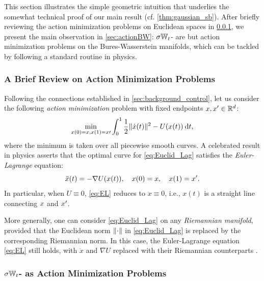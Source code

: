 This section illustrates the simple geometric intuition that underlies the somewhat technical proof of our main result (cf. \cref{thm:gaussian_sb}). After briefly reviewing the action minimization problems on Euclidean spaces in \cref{sec:actionRd}, we present the main observation in \cref{sec:actionBW}: $\sigma\mathbb{W}_{t}$- are but action minimization problems on the Bures-Wasserstein manifolds, which can be tackled by following a standard routine in physics. 

 
\subsubsection{A Brief Review on Action Minimization Problems}%
\label{sec:actionRd}

Following the connections established in \cref{sec:background_control}, let us consider the following \emph{action minimization} problem with fixed endpoints $x, x' \in \mathbb{R}^d$:
\begin{align}
\label{eq:Euclid_Lag}
\min_{x(0) = x, x(1) = x\prime} \int_0^1 {\frac{1}{2} \lVert\dot{x}(t)\rVert^2 - U(x(t)) } \:\mathrm{d} t,
\end{align}
where the minimum is taken over all piecewise smooth curves. 
A celebrated result in physics asserts that the optimal curve for \eqref{eq:Euclid_Lag} satisfies the \emph{Euler-Lagrange} equation:
\begin{equation}
\label{eq:EL}
\ddot{x}(t) = -\nabla U(x(t)), \quad x(0) = x,\quad x(1) = x'.
\end{equation}
In particular, when $U \equiv0$, \eqref{eq:EL} reduces to $\ddot{x} \equiv 0$, i.e., $x(t)$ is a straight line connecting $x$ and $x'$.

More generally, one can consider \eqref{eq:Euclid_Lag} on any \emph{Riemannian manifold}, provided that the Euclidean norm $\lVert\cdot\rVert$ in \eqref{eq:Euclid_Lag} is replaced by the corresponding Riemannian norm. In this case, the Euler-Lagrange equation \eqref{eq:EL} still holds, with $\ddot{x}$ and $\nabla U$ replaced with their Riemannian counterparts \citep{villani2009optimal}.

\subsubsection{$\sigma\mathbb{W}_{t}$- as Action Minimization Problems}

